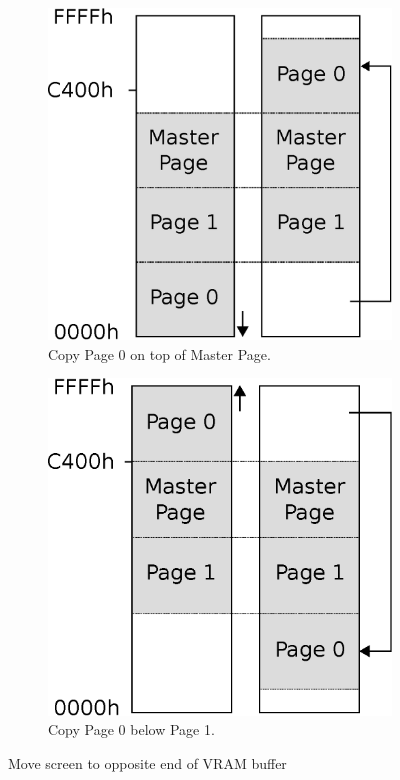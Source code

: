 \documentclass[book.tex]{subfiles}
\begin{document}
\par 
\begin{figure}[H]
\centering 
\begin{subfigure}{.5\textwidth}
  \centering
  \includegraphics[width=.85\textwidth]{imgs/drawings/Page_down_switch.eps}
  \caption*{Copy Page 0 on top of Master Page.}
  \label{fig:page0_down}
\end{subfigure}%
\begin{subfigure}{.5\textwidth}
  \centering
  \includegraphics[width=.85\textwidth]{imgs/drawings/Page_up_switch.eps}
    \caption*{Copy Page 0 below Page 1. }
  \label{fig:page0_up}
\end{subfigure}
\caption{Move screen to opposite end of VRAM buffer}
\label{fig:page_wrapping}
\end{figure}
\end{document}
